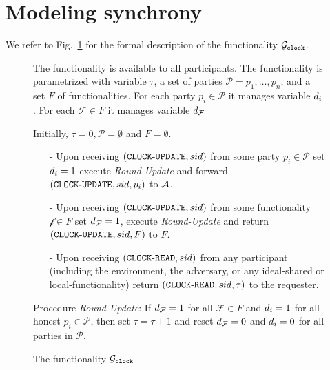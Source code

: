 \section{Modeling synchrony}

We refer to Fig.~\ref{fig:gclock} for the formal description of the functionality $\mathcal{G}_{\mathtt{clock}}$.
\begin{figure}[!h]
\setlength{\fboxsep}{12pt}
\begin{center}
\begin{boxedminipage}{12cm}
The functionality is available to all participants. The functionality is parametrized with variable $\tau$, a set of parties $\mathcal{P}={p_1,\dots, p_n}$, and a set $F$ of functionalities.
 For each party $p_i\in\mathcal{P}$ it manages variable $d_i$. For each $\mathcal{F}\in F$ 
it manages variable $d_\mathcal{F}$

Initially, $\tau=0, \mathcal{P}=\emptyset$ and $F=\emptyset$.

\begin{itemize}
\item[-] Upon receiving $(\mathtt{CLOCK\text{-}UPDATE},sid)$ from some party $p_i\in\mathcal{P}$ set $d_i=1$ 
execute \emph{Round-Update} and forward $(\mathtt{CLOCK\text{-}UPDATE}, sid , p_i)$ to $\mathcal{A}$.
\item[-] Upon receiving $(\mathtt{CLOCK\text{-}UPDATE}, sid)$ from some functionality $\mathcal{f}\in F$ set $d_\mathcal{F}=1$, execute \emph{Round-Update} and return $(\mathtt{CLOCK\text{-}UPDATE}, sid , F)$ to $F$.
\item[-] Upon receiving $(\mathtt{CLOCK\text{-}READ}, sid)$ from any participant (including the environment, the adversary, or any ideal-shared or local-functionality) return $(\mathtt{CLOCK\text{-}READ}, sid, \tau)$ to the requester.
\end{itemize}

Procedure \emph{Round-Update}:
If $d_\mathcal{F}=1$ for all $\mathcal{F}\in F$ and $d_i =1$ for all honest $p_i\in\mathcal{P}$, 
then set $\tau=\tau+1$ and reset $d_\mathcal{F}=0$ and $d_i=0$ for all parties in $\mathcal{P}$.

\end{boxedminipage}
\end{center}
\caption{The functionality $\mathcal{G}_{\mathtt{clock}}$} 
\label{fig:gclock}
\end{figure}
